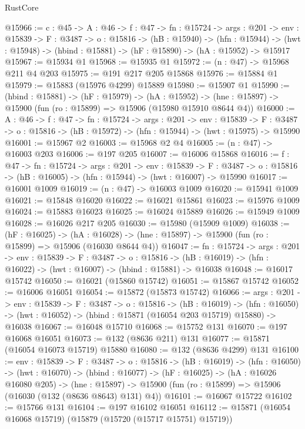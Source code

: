 \begin{lexlean}{RustCore}
\begin{coremodule}
@15966 := {c : @45} ->
  {A : @46} ->
  {f : @47} ->
  {fn : @15724} ->
  {args : @201} ->
  {env : @15839} ->
  {F : @3487} ->
  {o : @15816} ->
  (hB : @15940) ->
  (hfn : @15944) -> (hwt : @15948) -> (hbind : @15881) -> (hF : @15890) -> (hA : @15952) -> @15917
@15967 := @15934 @1
@15968 := @15935 @1
@15972 := (n : @47) -> @15968 @211 @4 @203
@15975 := @191 @217 @205 @15868
@15976 := @15884 @1
@15979 := @15883 (@15976 @4299) @15889
@15980 := @15907 @1
@15990 := (hbind : @15881) ->
  (hF : @15979) ->
  (hA : @15952) -> (hne : @15897) -> @15900 (fun (ro : @15899) => @15906 (@15980 @15910 @8644 @4))
@16000 := {A : @46} ->
  {f : @47} ->
  {fn : @15724} ->
  {args : @201} ->
  {env : @15839} ->
  {F : @3487} -> {o : @15816} -> (hB : @15972) -> (hfn : @15944) -> (hwt : @15975) -> @15990
@16001 := @15967 @2
@16003 := @15968 @2 @4
@16005 := (n : @47) -> @16003 @203
@16006 := @197 @205
@16007 := @16006 @15868
@16016 := {f : @47} ->
  {fn : @15724} ->
  {args : @201} ->
  {env : @15839} ->
  {F : @3487} -> {o : @15816} -> (hB : @16005) -> (hfn : @15944) -> (hwt : @16007) -> @15990
@16017 := @16001 @1009
@16019 := (n : @47) -> @16003 @1009
@16020 := @15941 @1009
@16021 := @15848 @16020
@16022 := @16021 @15861
@16023 := @15976 @1009
@16024 := @15883 @16023
@16025 := @16024 @15889
@16026 := @15949 @1009
@16028 := @16026 @217 @205
@16030 := @15980 (@15909 @1009)
@16038 := (hF : @16025) ->
  (hA : @16028) -> (hne : @15897) -> @15900 (fun (ro : @15899) => @15906 (@16030 @8644 @4))
@16047 := {fn : @15724} ->
  {args : @201} ->
  {env : @15839} ->
  {F : @3487} ->
  {o : @15816} -> (hB : @16019) -> (hfn : @16022) -> (hwt : @16007) -> (hbind : @15881) -> @16038
@16048 := @16017 @15742
@16050 := @16021 (@15860 @15742)
@16051 := @15867 @15742
@16052 := @16006 @16051
@16054 := @15872 (@15873 @15742)
@16066 := {args : @201} ->
  {env : @15839} ->
  {F : @3487} ->
  {o : @15816} ->
  (hB : @16019) ->
  (hfn : @16050) -> (hwt : @16052) -> (hbind : @15871 (@16054 @203 @15719) @15880) -> @16038
@16067 := @16048 @15710
@16068 := @15752 @131
@16070 := @197 @16068 @16051
@16073 := @132 (@8636 @211) @131
@16077 := @15871 (@16054 @16073 @15719) @15880
@16080 := @132 (@8636 @4299) @131
@16100 := {env : @15839} ->
  {F : @3487} ->
  {o : @15816} ->
  (hB : @16019) ->
  (hfn : @16050) ->
  (hwt : @16070) ->
  (hbind : @16077) ->
  (hF : @16025) ->
  (hA : @16026 @16080 @205) ->
  (hne : @15897) -> @15900 (fun (ro : @15899) => @15906 (@16030 (@132 (@8636 @8643) @131) @4))
@16101 := @16067 @15722
@16102 := @15766 @131
@16104 := @197 @16102 @16051
@16112 := @15871 (@16054 @16068 @15719) (@15879 (@15720 (@15717 @15751) @15719))

\end{coremodule}
\end{lexlean}
